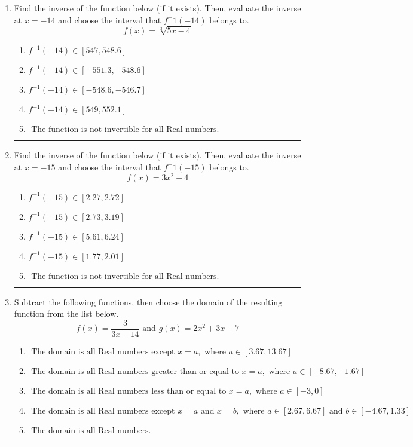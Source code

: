\documentclass[14pt]{extbook}
\newcommand{\litem}[1]{\item#1\hspace*{-1cm}\rule{\textwidth}{0.4pt}}
\begin{document}
\begin{enumerate}
{\begin{enumerate}[label=\Alph*.]
\end{enumerate} }
\litem{
Find the inverse of the function below (if it exists). Then, evaluate the inverse at $x = -14$ and choose the interval that $f^-1(-14)$ belongs to.\[ f(x) = \sqrt[3]{5 x - 4} \]\begin{enumerate}[label=\Alph*.]
\item \( f^{-1}(-14) \in [547, 548.6] \)
\item \( f^{-1}(-14) \in [-551.3, -548.6] \)
\item \( f^{-1}(-14) \in [-548.6, -546.7] \)
\item \( f^{-1}(-14) \in [549, 552.1] \)
\item \( \text{ The function is not invertible for all Real numbers. } \)

\end{enumerate} }
\litem{
Find the inverse of the function below (if it exists). Then, evaluate the inverse at $x = -15$ and choose the interval that $f^-1(-15)$ belongs to.\[ f(x) = 3 x^2 - 4 \]\begin{enumerate}[label=\Alph*.]
\item \( f^{-1}(-15) \in [2.27, 2.72] \)
\item \( f^{-1}(-15) \in [2.73, 3.19] \)
\item \( f^{-1}(-15) \in [5.61, 6.24] \)
\item \( f^{-1}(-15) \in [1.77, 2.01] \)
\item \( \text{ The function is not invertible for all Real numbers. } \)

\end{enumerate} }
\litem{
Subtract the following functions, then choose the domain of the resulting function from the list below.\[ f(x) = \frac{3}{3x-14} \text{ and } g(x) = 2x^{2} +3 x + 7 \]\begin{enumerate}[label=\Alph*.]
\item \( \text{ The domain is all Real numbers except } x = a, \text{ where } a \in [3.67, 13.67] \)
\item \( \text{ The domain is all Real numbers greater than or equal to } x = a, \text{ where } a \in [-8.67, -1.67] \)
\item \( \text{ The domain is all Real numbers less than or equal to } x = a, \text{ where } a \in [-3, 0] \)
\item \( \text{ The domain is all Real numbers except } x = a \text{ and } x = b, \text{ where } a \in [2.67, 6.67] \text{ and } b \in [-4.67, 1.33] \)
\item \( \text{ The domain is all Real numbers. } \)

\end{enumerate} }
\end{enumerate}
\end{document}
